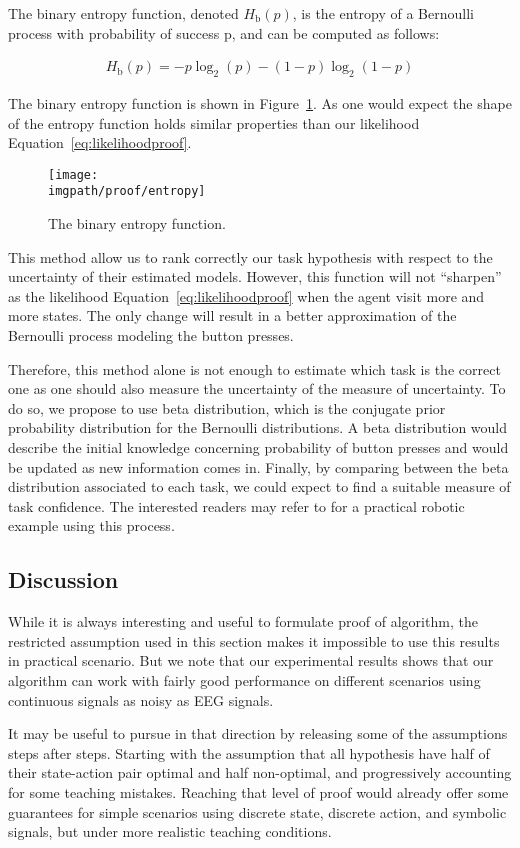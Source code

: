 The binary entropy function, denoted $H_{\mathrm b}(p)$, is the entropy of a Bernoulli process with probability of success p, and can be computed as follows:

\begin{eqnarray}
H_{\mathrm b}(p) = -p\log_2(p) - (1-p)\log_2(1-p) 
\label{eq:likelihoodentropy}
\end{eqnarray}

The binary entropy function is shown in Figure~\ref{fig:prooflikelihoodentropy}. As one would expect the shape of the entropy function holds similar properties than our likelihood Equation~\ref{eq:likelihoodproof}.
    
\begin{figure}[!htbp]
\centering
\texttt{[image: \\imgpath/proof/entropy]}
\caption{The binary entropy function.}
\label{fig:prooflikelihoodentropy}
\end{figure}

This method allow us to rank correctly our task hypothesis with respect to the uncertainty of their estimated models. However, this function will not ``sharpen'' as the likelihood Equation~\ref{eq:likelihoodproof} when the agent visit more and more states. The only change will result in a better approximation of the Bernoulli process modeling the button presses.

Therefore, this method alone is not enough to estimate which task is the correct one as one should also measure the uncertainty of the measure of uncertainty. To do so, we propose to use beta distribution, which is the conjugate prior probability distribution for the Bernoulli distributions. A beta distribution would describe the initial knowledge concerning probability of button presses and would be updated as new information comes in. Finally, by comparing between the beta distribution associated to each task, we could expect to find a suitable measure of task confidence. The interested readers may refer to \cite{montesano2012active} for a practical robotic example using this process.

\subsection{Discussion}

While it is always interesting and useful to formulate proof of algorithm, the restricted assumption used in this section makes it impossible to use this results in practical scenario. But we note that our experimental results shows that our algorithm can work with fairly good performance on different scenarios using continuous signals as noisy as EEG signals.

It may be useful to pursue in that direction by releasing some of the assumptions steps after steps. Starting with the assumption that all hypothesis have half of their state-action pair optimal and half non-optimal, and progressively accounting for some teaching mistakes. Reaching that level of proof would already offer some guarantees for simple scenarios using discrete state, discrete action, and symbolic signals, but under more realistic teaching conditions.
